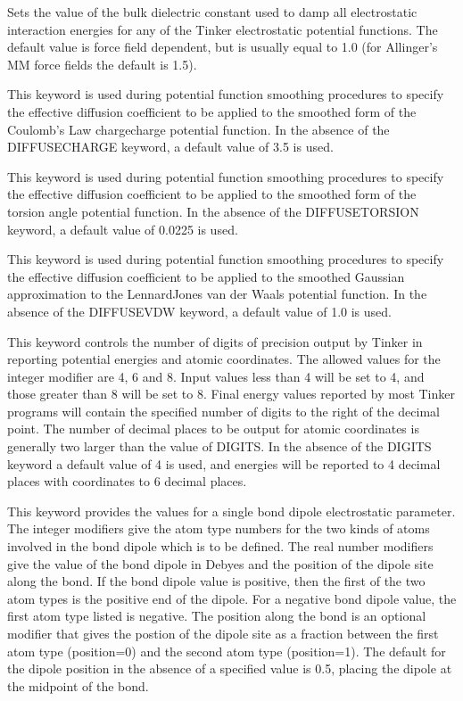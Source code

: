\documentclass[letterpaper,11pt,english]{sphinxmanual}
\begin{document}
  Sets the value of the bulk dielectric constant used to damp all electrostatic interaction energies for any of the Tinker electrostatic potential functions. The default value is force field dependent, but is usually equal to 1.0 (for Allinger’s MM force fields the default is 1.5).

  This keyword is used during potential function smoothing procedures to specify the effective diffusion coefficient to be applied to the smoothed form of the Coulomb’s Law charge\sphinxhyphen{}charge potential function. In the absence of the DIFFUSE\sphinxhyphen{}CHARGE keyword, a default value of 3.5 is used.

  This keyword is used during potential function smoothing procedures to specify the effective diffusion coefficient to be applied to the smoothed form of the torsion angle potential function. In the absence of the DIFFUSE\sphinxhyphen{}TORSION keyword, a default value of 0.0225 is used.

  This keyword is used during potential function smoothing procedures to specify the effective diffusion coefficient to be applied to the smoothed Gaussian approximation to the Lennard\sphinxhyphen{}Jones van der Waals potential function. In the absence of the DIFFUSE\sphinxhyphen{}VDW keyword, a default value of 1.0 is used.

  This keyword controls the number of digits of precision  output by Tinker in reporting potential energies and atomic coordinates. The allowed values for the integer modifier are 4, 6 and 8. Input values less than 4 will be set to 4, and those greater than 8 will be set to 8. Final energy values reported by most Tinker programs will contain the specified number of digits to the right of the decimal point. The number of decimal places to be output for atomic coordinates is generally two larger than the value of DIGITS. In the absence of the DIGITS keyword a default value of 4 is used, and  energies will be reported to 4 decimal places with coordinates to 6 decimal places.

  This keyword provides the values for a single bond dipole electrostatic parameter. The integer modifiers give the atom type numbers for the two kinds of atoms involved in the bond dipole which is to be defined. The real number modifiers give the value of the bond dipole in Debyes and the position of the dipole site along the bond. If the bond dipole value is positive, then the first of the two atom types is the positive end of the dipole. For a negative bond dipole value, the first atom type listed is negative. The position along the bond is an optional modifier that gives the postion of the dipole site as a fraction between the first atom type (position=0) and the second atom type (position=1). The default for the dipole position in the absence of a specified value is 0.5, placing the dipole at the midpoint of the bond.
\end{document}
